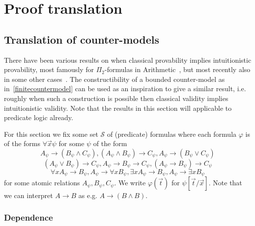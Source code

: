 \documentclass[a4paper,12pt]{report}
\theoremstyle{definition}
\theoremstyle{definition}
\theoremstyle{definition}
\theoremstyle{definition}
\theoremstyle{definition}
\theoremstyle{definition}
\theoremstyle{definition}
\begin{document}
	
	\chapter{Proof translation}

	
	\section{Translation of counter-models}
	
	There have been various results on when classical provability implies intuitionistic provability, most famously for $\Pi_2$-formulas in Arithmetic~\cite{Friedman_1978}, but most recently also in some other cases~\cite{schwichtenberg, practical}. The constructibility of a bounded counter-model as in~\ref{finitecountermodel} can be used as an inspiration to give a similar result, i.e. roughly when such a construction is possible then classical validity implies intuitionistic validity. Note that the results in this section will applicable to predicate logic already.
	
	For this section we fix some set $\mathcal S$ of (predicate) formulas where each formula $\varphi$ is of the forms $\forall \vec x\psi$ for some $\psi$ of the form
	$$A_\psi\to(B_\psi\wedge C_\psi), (A_\psi\wedge B_\psi)\to C_\psi, A_\psi\to (B_\psi\vee C_\psi)$$$$(A_\psi\vee B_\psi)\to C_\psi, A_\psi\to B_\psi\to C_\psi, (A_\psi\to B_\psi)\to  C_\psi$$$$\forall xA_\psi\to B_\psi, A_\psi\to \forall xB_\psi, \exists xA_\psi\to B_\psi, A_\psi\to\exists xB_\psi$$
	for some atomic relations $A_\psi, B_\psi, C_\psi$. We write $\varphi(\vec t)$ for $\psi[\vec t/\vec x]$. Note that we can interpret $A\to B$ as e.g. $A\to (B\wedge B)$. 
	
	\subsection{Dependence}
	
\end{document}
